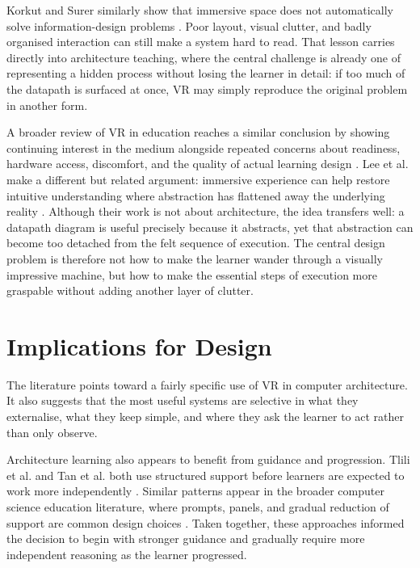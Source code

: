 Korkut and Surer similarly show that immersive space does not automatically solve information-design problems \cite{korkut2023visualization}. Poor layout, visual clutter, and badly organised interaction can still make a system hard to read. That lesson carries directly into architecture teaching, where the central challenge is already one of representing a hidden process without losing the learner in detail: if too much of the datapath is surfaced at once, VR may simply reproduce the original problem in another form.

A broader review of VR in education reaches a similar conclusion by showing continuing interest in the medium alongside repeated concerns about readiness, hardware access, discomfort, and the quality of actual learning design \cite{samala2025virtual}. Lee et al. make a different but related argument: immersive experience can help restore intuitive understanding where abstraction has flattened away the underlying reality \cite{lee2020data}. Although their work is not about architecture, the idea transfers well: a datapath diagram is useful precisely because it abstracts, yet that abstraction can become too detached from the felt sequence of execution. The central design problem is therefore not how to make the learner wander through a visually impressive machine, but how to make the essential steps of execution more graspable without adding another layer of clutter.

\section{Implications for Design}

The literature points toward a fairly specific use of VR in computer architecture. It also suggests that the most useful systems are selective in what they externalise, what they keep simple, and where they ask the learner to act rather than only observe.

Architecture learning also appears to benefit from guidance and progression. Tlili et al. and Tan et al. both use structured support before learners are expected to work more independently \cite{tlili2016improving,tan2023vr}. Similar patterns appear in the broader computer science education literature, where prompts, panels, and gradual reduction of support are common design choices \cite{janani2026virtual}. Taken together, these approaches informed the decision to begin with stronger guidance and gradually require more independent reasoning as the learner progressed.

